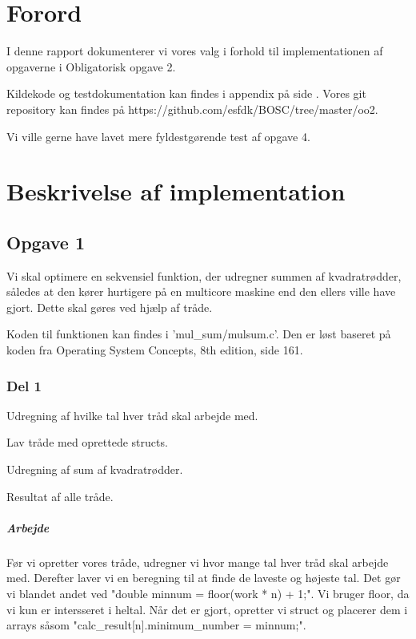 \chapter{Forord}
I denne rapport dokumenterer vi vores valg i forhold til implementationen af opgaverne i Obligatorisk opgave 2.

Kildekode og testdokumentation kan findes i appendix på side \pageref{Appendix}. Vores git repository kan findes på https://github.com/esfdk/BOSC/tree/master/oo2.

Vi ville gerne have lavet mere fyldestgørende test af opgave 4.

\chapter{Beskrivelse af implementation}
\section{Opgave 1}
\label{O1}
Vi skal optimere en sekvensiel funktion, der udregner summen af kvadratrødder, således at den kører hurtigere på en multicore maskine end den ellers ville have gjort. Dette skal gøres ved hjælp af tråde.

Koden til funktionen kan findes i 'mul_sum/mulsum.c'. Den er løst baseret på koden fra Operating System Concepts, 8th edition, side 161.

\subsection{Del 1}
\label{O1_1}
\begin{my_itemize}
\item Udregning af hvilke tal hver tråd skal arbejde med.
\item Lav tråde med oprettede structs.
\item Udregning af sum af kvadratrødder.
\item Resultat af alle tråde.
\end{my_itemize}
\paragraph{Arbejde} Før vi opretter vores tråde, udregner vi hvor mange tal hver tråd skal arbejde med. Derefter laver vi en beregning til at finde de laveste og højeste tal. Det gør vi blandet andet ved "double minnum = floor(work * n) + 1;". Vi bruger floor, da vi kun er intersseret i heltal. Når det er gjort, opretter vi struct og placerer dem i arrays såsom "calc\_result[n].minimum\_number = minnum;". 
